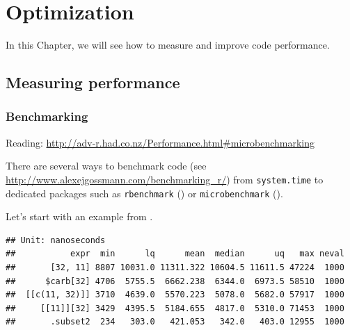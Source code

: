 \documentclass[]{book}
\newenvironment{Shaded}{\begin{snugshade}}{\end{snugshade}}
\newcommand{\KeywordTok}[1]{\textcolor[rgb]{0.13,0.29,0.53}{\textbf{#1}}}
\newcommand{\DataTypeTok}[1]{\textcolor[rgb]{0.13,0.29,0.53}{#1}}
\newcommand{\DecValTok}[1]{\textcolor[rgb]{0.00,0.00,0.81}{#1}}
\newcommand{\StringTok}[1]{\textcolor[rgb]{0.31,0.60,0.02}{#1}}
\newcommand{\CommentTok}[1]{\textcolor[rgb]{0.56,0.35,0.01}{\textit{#1}}}
\newcommand{\OperatorTok}[1]{\textcolor[rgb]{0.81,0.36,0.00}{\textbf{#1}}}
\newcommand{\NormalTok}[1]{#1}
\theoremstyle{definition}
\theoremstyle{definition}
\theoremstyle{definition}
\theoremstyle{remark}
\begin{document}
\chapter{Optimization}\label{optimization}

In this Chapter, we will see how to measure and improve code
performance.

\section{Measuring performance}\label{measuring-performance}

\subsection{Benchmarking}\label{benchmarking}

Reading:
\url{http://adv-r.had.co.nz/Performance.html\#microbenchmarking}

There are several ways to benchmark code (see
\url{http://www.alexejgossmann.com/benchmarking_r/}) from
\texttt{system.time} to dedicated packages such as \texttt{rbenchmark}
(\citet{rbenchmark}) or \texttt{microbenchmark}
(\citet{microbenchmark}).

Let's start with an example from \citet{Wickham2014}.

\begin{Shaded}
\end{Shaded}

\begin{verbatim}
## Unit: nanoseconds
##           expr  min      lq      mean  median      uq   max neval
##       [32, 11] 8807 10031.0 11311.322 10604.5 11611.5 47224  1000
##      $carb[32] 4706  5755.5  6662.238  6344.0  6973.5 58510  1000
##  [[c(11, 32)]] 3710  4639.0  5570.223  5078.0  5682.0 57917  1000
##     [[11]][32] 3429  4395.5  5184.655  4817.0  5310.0 71453  1000
##       .subset2  234   303.0   421.053   342.0   403.0 12955  1000
\end{verbatim}
\end{document}

